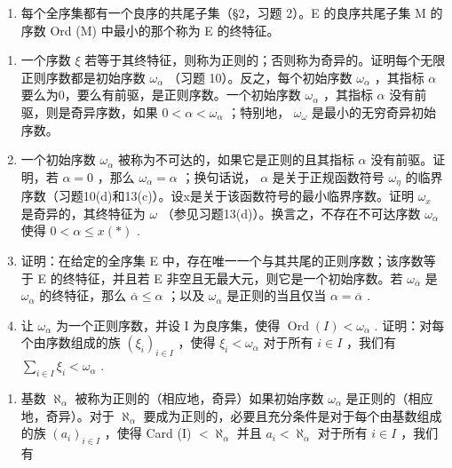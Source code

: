 \begin{enumerate}
\def\labelenumi{\arabic{enumi}.}
\setcounter{enumi}{15}
\tightlist
\item
  每个全序集都有一个良序的共尾子集（§2，习题 2）。E 的良序共尾子集 M 的序数 Ord (M) 中最小的那个称为 E 的终特征。
\end{enumerate}

\begin{enumerate}
\def\labelenumi{(\alph{enumi})}
\item
  一个序数 \(\xi\) 若等于其终特征，则称为正则的；否则称为奇异的。证明每个无限正则序数都是初始序数 \(\omega_{\alpha}\) （习题 10）。反之，每个初始序数 \(\omega_{\alpha}\) ，其指标 \(\alpha\) 要么为0，要么有前驱，是正则序数。一个初始序数 \(\omega_{\alpha}\) ，其指标 \(\alpha\) 没有前驱，则是奇异序数，如果 \(0 < \alpha < \omega_{\alpha}\) ；特别地， \(\omega_{\omega}\) 是最小的无穷奇异初始序数。
\item
  一个初始序数 \(\omega_{\alpha}\) 被称为不可达的，如果它是正则的且其指标 \(\alpha\) 没有前驱。证明，若 \(\alpha = 0\) ，那么 \(\omega_{\alpha} = \alpha\) ；换句话说， \(\alpha\) 是关于正规函数符号 \(\omega_{\eta}\) 的临界序数（习题10(d)和13(c)）。设x是关于该函数符号的最小临界序数。证明 \(\omega_{x}\) 是奇异的，其终特征为 \(\omega\) （参见习题13(d)）。换言之，不存在不可达序数 \(\omega_{\alpha}\) 使得 \(0 < \alpha \leqslant x (*)\) .
\item
  证明：在给定的全序集 E 中，存在唯一一个与其共尾的正则序数；该序数等于 E 的终特征，并且若 E 非空且无最大元，则它是一个初始序数。若 \(\omega_{\overline{\alpha}}\) 是 \(\omega_{\alpha}\) 的终特征，那么 \(\overline{\alpha} \leqslant \alpha\) ；以及 \(\omega_{\alpha}\) 是正则的当且仅当 \(\alpha = \overline{\alpha}\) .
\item
  让 \(\omega_{\alpha}\) 为一个正则序数，并设 I 为良序集，使得 \(\operatorname{Ord}(I) < \omega_{\alpha}\) . 证明：对每个由序数组成的族 \((\xi_{i})_{i \in I}\) ，使得 \(\xi_{i} < \omega_{\alpha}\) 对于所有 \(i \in I\) ，我们有 \(\sum_{i \in I} \xi_{i} < \omega_{\alpha}\) .
\end{enumerate}

\begin{enumerate}
\def\labelenumi{\arabic{enumi}.}
\setcounter{enumi}{16}
\tightlist
\item
  基数 \(\aleph_{\alpha}\) 被称为正则的（相应地，奇异）如果初始序数 \(\omega_{\alpha}\) 是正则的（相应地，奇异）。对于 \(\aleph_{\alpha}\) 要成为正则的，必要且充分条件是对于每个由基数组成的族 \((a_{i})_{i\in I}\) ，使得 Card (I) \(< \aleph_{\alpha}\) 并且 \(a_{i} < \aleph_{\alpha}\) 对于所有 \(i\in I\) ，我们有
\end{enumerate}


